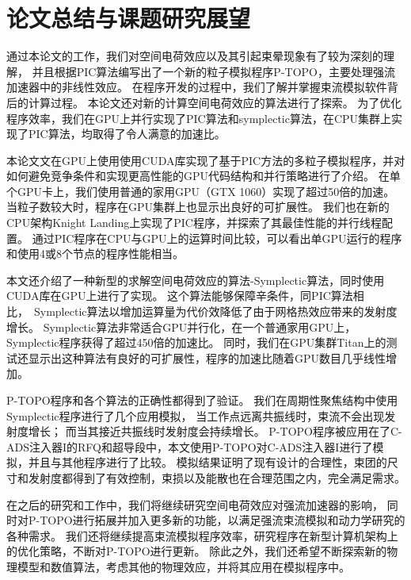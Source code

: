 
\chapter{论文总结与课题研究展望}
\label{chap:conclusion}
通过本论文的工作，我们对空间电荷效应以及其引起束晕现象有了较为深刻的理解，
并且根据PIC算法编写出了一个新的粒子模拟程序P-TOPO，主要处理强流加速器中的非线性效应。
在程序开发的过程中，我们了解并掌握束流模拟软件背后的计算过程。
本论文还对新的计算空间电荷效应的算法进行了探索。
为了优化程序效率，我们在GPU上并行实现了PIC算法和symplectic算法，在CPU集群上实现了PIC算法，均取得了令人满意的加速比。

本论文文在GPU上使用使用CUDA库实现了基于PIC方法的多粒子模拟程序，并对如何避免竞争条件和实现更高性能的GPU代码结构和并行策略进行了介绍。
在单个GPU卡上，我们使用普通的家用GPU（GTX 1060）实现了超过50倍的加速。
当粒子数较大时，程序在GPU集群上也显示出良好的可扩展性。
我们也在新的CPU架构Knight Landing上实现了PIC程序，并探索了其最佳性能的并行线程配置。
通过PIC程序在CPU与GPU上的运算时间比较，可以看出单GPU运行的程序和使用4或8个节点的程序性能相当。

本文还介绍了一种新型的求解空间电荷效应的算法-Symplectic算法，同时使用CUDA库在GPU上进行了实现。
这个算法能够保障辛条件，同PIC算法相比，~Symplectic算法以增加运算量为代价效降低了由于网格热效应带来的发射度增长。
Symplectic算法非常适合GPU并行化，在一个普通家用GPU上，Symplectic程序获得了超过450倍的加速比。
同时，我们在GPU集群Titan上的测试还显示出这种算法有良好的可扩展性，程序的加速比随着GPU数目几乎线性增加。

P-TOPO程序和各个算法的正确性都得到了验证。
我们在周期性聚焦结构中使用Symplectic程序进行了几个应用模拟，
当工作点远离共振线时，束流不会出现发射度增长；
而当其接近共振线时发射度会持续增长。
P-TOPO程序被应用在了C-ADS注入器I的RFQ和超导段中，本文使用P-TOPO对C-ADS注入器I进行了模拟，并且与其他程序进行了比较。
模拟结果证明了现有设计的合理性，束团的尺寸和发射度都得到了有效控制，束损以及能散也在合理范围之内，完全满足需求。

在之后的研究和工作中，我们将继续研究空间电荷效应对强流加速器的影响，
同时对P-TOPO进行拓展并加入更多新的功能，以满足强流束流模拟和动力学研究的各种需求。
我们还将继续提高束流模拟程序效率，研究程序在新型计算机架构上的优化策略，不断对P-TOPO进行更新。
除此之外，我们还希望不断探索新的物理模型和数值算法，考虑其他的物理效应，并将其应用在模拟程序中。